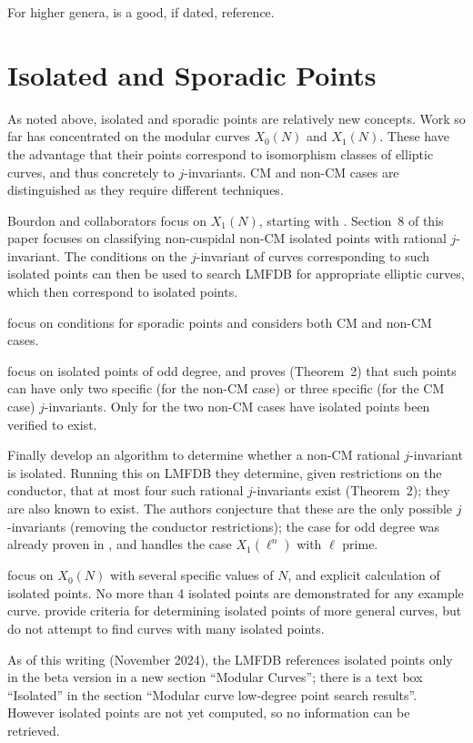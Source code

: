 \documentclass[12pt, reqno]{amsart}
\numberwithin{equation}{section}
\numberwithin{table}{section}
\begin{document}
For higher genera, \cite{Caporaso1995} is a good, if dated, reference.

\section{Isolated and Sporadic Points}

As noted above, isolated and sporadic points are relatively new
concepts. Work so far has concentrated on the modular curves $X_0(N)$
and $X_1(N)$. These have the advantage that their points correspond to
isomorphism classes of elliptic curves, and thus concretely to
$j$-invariants. CM and non-CM cases are distinguished as they
require different techniques.

Bourdon and collaborators focus on $X_1(N)$, starting with
\cite{Bourdon2019}. Section~8 of this paper focuses on classifying
non-cuspidal non-CM isolated points with rational $j$-invariant. The
conditions on the $j$-invariant of curves corresponding to such
isolated points can then be used to search LMFDB for appropriate
elliptic curves, which then correspond to isolated points.

\cite{Bourdon2021} focus on conditions for sporadic points and
considers both CM and non-CM cases.

\cite{Bourdon2024} focus on isolated points of odd degree, and
proves (Theorem~2) that such points can have only two specific (for
the non-CM case) or three specific (for the CM case)
$j$-invariants. Only for the two non-CM cases have isolated points
been verified to exist.

Finally \cite{Bourdon2025} develop an algorithm to determine whether a
non-CM rational $j$-invariant is isolated. Running this on LMFDB they
determine, given restrictions on the conductor, that at most four such
rational $j$-invariants exist (Theorem~2); they are also known to
exist. The authors conjecture that these are the only possible
$j$-invariants (removing the conductor restrictions); the case for odd
degree was already proven in \cite{Bourdon2024}, and \cite{Ejder2022}
handles the case $X_1(\ell^n)$ with $\ell$ prime.

\cite{Box2023} focus on $X_0(N)$ with several specific values of $N$,
and explicit calculation of isolated points. No more than 4 isolated
points are demonstrated for any example curve.  \cite{Khawaja2024}
provide criteria for determining isolated points of more general
curves, but do not attempt to find curves with many isolated
points.

As of this writing (November 2024), the LMFDB references isolated
points only in the beta version \cite{lmfdb_beta} in a new section
``Modular Curves''; there is a text box ``Isolated'' in the section
``Modular curve low-degree point search results''. However isolated
points are not yet computed, so no information can be retrieved.


\end{document}
